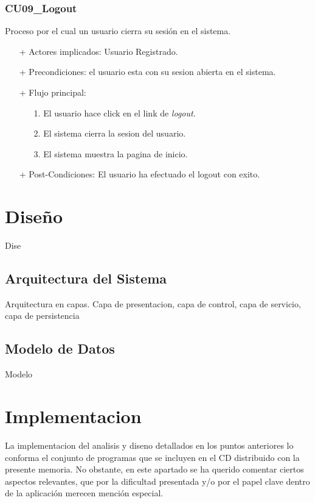 \documentclass[a4paper]{report}
\begin{document}
            \subsubsection{CU09\_Logout}
                Proceso por el cual un usuario cierra su sesi\'on en el sistema.
                \begin{itemize}
                    \item[+] Actores implicados: Usuario Registrado.
                    \item[+] Precondiciones: el usuario esta con su sesion abierta en el sistema.
                    \item[+] Flujo principal:
                    \begin{enumerate}
                        \item[1.] El usuario hace click en el link de \emph{logout}.
                        \item[2.] El sistema cierra la sesion del usuario.
                        \item[3.] El sistema muestra la pagina de inicio.
                    \end{enumerate}
                    \item[+] Post-Condiciones: El usuario ha efectuado el logout con exito.
                \end{itemize}


    \section{Diseño}
    Dise
    \subsection{Arquitectura del Sistema}
    Arquitectura en capas. Capa de presentacion, capa de control, capa de servicio, capa de persistencia
    \subsection{Modelo de Datos}
    Modelo

    \section{Implementacion}
    La implementacion del analisis y diseno detallados en los puntos anteriores lo conforma el conjunto de programas que se incluyen en el CD distribuido con la presente memoria.
    No obstante, en este apartado se ha querido comentar ciertos aspectos relevantes, que por la dificultad presentada y/o por el papel clave dentro de la aplicación merecen mención especial.
    
\end{document}
